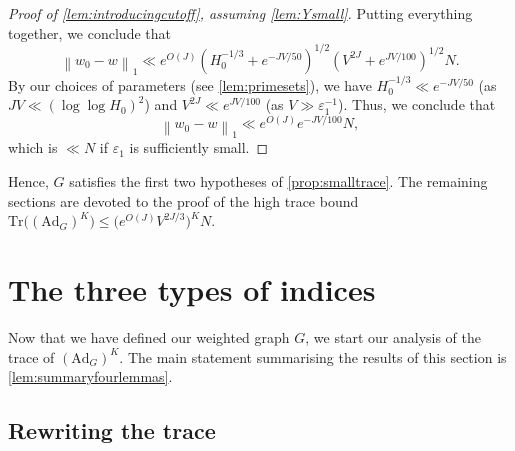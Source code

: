 \documentclass[11pt]{amsart}
\theoremstyle{definition}
\renewcommand{\leq}{\leqslant}
\newcommand{\norm}[1]{\left\|#1\right\|}
\newcommand{\eps}{\varepsilon}
\newcommand{\Ad}{\mathrm{Ad}}
\newcommand{\Tr}{\mathrm{Tr}}
\newcommand{\cstH}{\eps_1}
\newcommand{\curlyL}{V}
\newcommand{\curlyLexp}[1]{V^{#1}}
\newcommand{\graph}{G}
\newcommand{\repR}{J}
\newcommand{\repK}{K}
\begin{document}
\begin{proof}[Proof of \cref{lem:introducingcutoff}, assuming \cref{lem:Ysmall}]
Putting everything together, we conclude that
\begin{equation*}
\norm{w_0-w}_1 \ll e^{O(\repR)} \left(H_0^{-1/3} + e^{-\repR \curlyL/50}\right)^{1/2} \left(\curlyL^{2\repR} + e^{\repR\curlyL/100}\right)^{1/2} N.
\end{equation*}
By our choices of parameters (see \cref{lem:primesets}), we have $H_0^{-1/3} \ll e^{-\repR\curlyL/50}$ (as $\repR\curlyL\ll (\log \log H_0)^2$) and $\curlyL^{2\repR} \ll e^{\repR\curlyL/100}$ (as $\curlyL \gg \cstH^{-1}$). Thus, we conclude that 
\begin{equation*}
\norm{w_0-w}_1 \ll e^{O(\repR)} e^{-\repR\curlyL/100} N,
\end{equation*}
which is $\ll N$ if $\cstH$ is sufficiently small.
\end{proof}


Hence, $\graph$ satisfies the first two hypotheses of \cref{prop:smalltrace}. The remaining sections are devoted to the proof of the high trace bound $\Tr\big((\Ad_{\graph})^{\repK}\big) \leq \big( e^{O(\repR)} \curlyLexp{2\repR/3}\big)^{\repK} N$.











\section{The three types of indices}
\label{sec:tracecomputations}
Now that we have defined our weighted graph $\graph$, we start our analysis of the trace of $(\Ad_{\graph})^{\repK}$. The main statement summarising the results of this section is \cref{lem:summaryfourlemmas}.

\subsection{Rewriting the trace}
\end{document}
